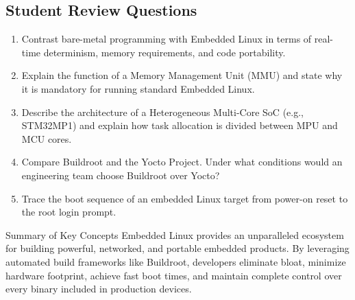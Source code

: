 \subsection{Student Review Questions}
\begin{enumerate}[leftmargin=*]
    \item Contrast bare-metal programming with Embedded Linux in terms of real-time determinism, memory requirements, and code portability.
    \item Explain the function of a Memory Management Unit (MMU) and state why it is mandatory for running standard Embedded Linux.
    \item Describe the architecture of a Heterogeneous Multi-Core SoC (e.g., STM32MP1) and explain how task allocation is divided between MPU and MCU cores.
    \item Compare Buildroot and the Yocto Project. Under what conditions would an engineering team choose Buildroot over Yocto?
    \item Trace the boot sequence of an embedded Linux target from power-on reset to the root login prompt.
\end{enumerate}

\begin{takeawaybox}{Summary of Key Concepts}
Embedded Linux provides an unparalleled ecosystem for building powerful, networked, and portable embedded products. By leveraging automated build frameworks like Buildroot, developers eliminate bloat, minimize hardware footprint, achieve fast boot times, and maintain complete control over every binary included in production devices.
\end{takeawaybox}
